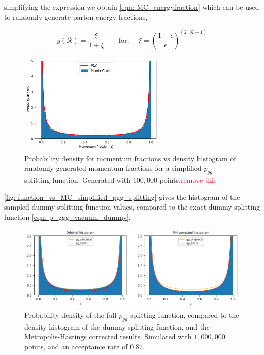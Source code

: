 \documentclass[main.tex]{subfiles}
\begin{document}
simplifying the expression we obtain \autoref{eqn: MC_energyfraction} which can be used to randomly generate parton energy fractions, 

\begin{equation}\label{eqn: MC_energyfraction}
    y(\mathcal{R}) = \frac{\xi}{1+ \xi} \qquad \text{for, } \quad \xi = \left(\frac{1-\epsilon}{\epsilon}\right)^{(2\cdot \mathcal{R}-1)}
\end{equation}


\begin{figure}[h]
    \centering
    \includegraphics[width=7cm]{pictures/MH_plots/p_ggg_simple_MCvsPZ.png}
    \caption{Probability density for momentum fractions vs density histogram of randomly generated momentum fractions for a simplified \(p_{gg}\) splitting function. Generated with \(100,000\) points.\textcolor{red}{remove this}}
    \label{fig: function_vs_MC_simplified_pgg_splitting}
\end{figure}

\autoref{fig: function_vs_MC_simplified_pgg_splitting} gives the histogram of the sampled dummy splitting function values, compared to the exact dummy splitting function \autoref{eqn: p_ggg_vacuum_dummy}. 


\begin{figure}[h]
    \centering
    \includegraphics[width=14cm]{pictures/MH_plots/MH_vacuum_gg.png}
    \caption{Probability density of the full \(p_{gg}\) splitting function, compared to the density histogram of the dummy splitting function, and the Metropolis-Hastings corrected results. Simulated with \(1,000,000\) points, and an acceptance rate of \(0.87\).}
    \label{fig: MH_corrected_p_gg_splitting}
\end{figure}
\end{document}
